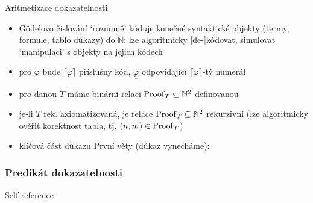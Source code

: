 \documentclass{beamer}
\begin{document}
\begin{frame}{Aritmetizace dokazatelnosti}
    
    \begin{itemize}
        \item \alert{Gödelovo číslování} `rozumně' kóduje konečné syntaktické objekty (termy, formule, tablo důkazy) do $\mathbb N$: lze algoritmicky [de-]kódovat, simulovat `manipulaci' s objekty na jejich kódech
        \item pro $\varphi$ bude \alert{$\lceil\varphi\rceil$} příslušný kód, \alert{$\underline{\varphi}$} odpovídající $\lceil\varphi\rceil$-tý numerál
        \item pro danou $T$ máme binární relaci $\operatorname{Proof}_T\subseteq\mathbb N^2$ definovanou
        \hspace{-1cm}
        \item je-li $T$ rek. axiomatizovaná, je relace $\operatorname{Proof}_T\subseteq\mathbb N^2$ \alert{rekurzivní} (lze algoritmicky ověřit korektnost tabla, tj. $(n,m)\in\operatorname{Proof}_T$)
        \item klíčová část důkazu První věty (důkaz vynecháme):
    \end{itemize}


\end{frame}


\begin{frame}
    \frametitle{Predikát dokazatelnosti}

    

\end{frame}


\begin{frame}{Self-reference}
    

\end{frame}
\end{document}
